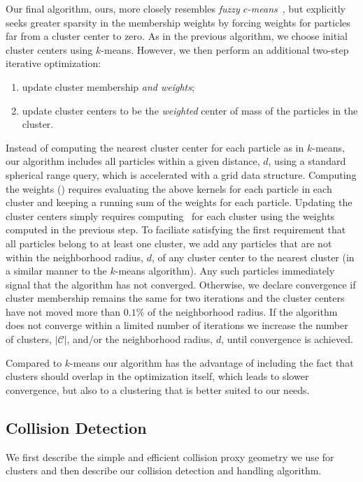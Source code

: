 \documentclass[review]{acmsiggraph}
\begin{document}
Our final algorithm, $\mathrm{ours}$, more closely resembles {\em fuzzy $c$-means}~\cite{Dunn:1973:AFR,Bezdek:1981:PRF}, 
but explicitly seeks greater sparsity in the membership weights by forcing
weights for particles far from a cluster center to zero.  As in the previous algorithm, we choose initial cluster centers using $k$-means.
However, we then perform an additional two-step iterative optimization:
\begin{enumerate}
\item update cluster membership {\em and weights};
\item update cluster centers to be the {\em weighted} center of mass of the particles in the cluster.
\end{enumerate}
Instead of computing the nearest cluster center for each particle as in $k$-means, our algorithm includes all particles within a given distance, 
$d$, using a standard spherical range query, which is accelerated with a grid data structure.  Computing the weights 
() requires evaluating the above 
kernels for each particle in each cluster and keeping a running sum of the weights for each particle.  Updating the cluster centers simply requires 
computing~ for each cluster using the weights computed in the previous step.  To faciliate satisfying the first requirement that 
all particles belong to at least one cluster, we add any particles that are not within the neighborhood radius, $d$, of 
any cluster center to the nearest cluster 
(in a similar manner to the $k$-means algorithm).  Any such particles immediately signal that the algorithm has not converged.  Otherwise,
we declare convergence if cluster membership remains the same for two iterations and the cluster centers have not moved more than $0.1\%$ of the neighborhood radius.   
If the algorithm
does not converge within a limited number of iterations we increase the number of clusters, $|\mathcal{C}|$, and/or the neighborhood radius, $d$, until convergence is achieved.

Compared to $k$-means our algorithm has the advantage of including the fact that clusters should overlap in the optimization itself, which leads to slower convergence, but
also to a clustering that is better suited to our needs.

\subsection{Collision Detection}
We first describe the simple and efficient collision proxy geometry we use for clusters and then describe
our collision detection and handling algorithm.
\end{document}
